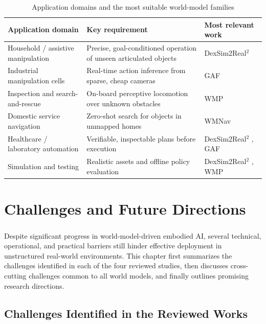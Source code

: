 \documentclass[12pt,a4paper,final]{extreport}
\begin{document}
{\renewcommand{\arraystretch}{1.35}
\begin{table}[htbp]
\centering
\caption{Application domains and the most suitable world-model families}\label{tab:applications}
\small
\begin{tabularx}{\textwidth}{|p{3.6cm}|X|p{3.2cm}|}
\hline
\textbf{Application domain} & \textbf{Key requirement} & \textbf{Most relevant work} \\ \hline
Household / assistive manipulation & Precise, goal-conditioned operation of unseen articulated objects & DexSim2Real$^2$ \cite{p1} \\ \hline
Industrial manipulation cells & Real-time action inference from sparse, cheap cameras & GAF \cite{p2} \\ \hline
Inspection and search-and-rescue & On-board perceptive locomotion over unknown obstacles & WMP \cite{p3} \\ \hline
Domestic service navigation & Zero-shot search for objects in unmapped homes & WMNav \cite{p4} \\ \hline
Healthcare / laboratory automation & Verifiable, inspectable plans before execution & DexSim2Real$^2$ \cite{p1}, GAF \cite{p2} \\ \hline
Simulation and testing & Realistic assets and offline policy evaluation & DexSim2Real$^2$ \cite{p1}, WMP \cite{p3} \\ \hline
\end{tabularx}
\end{table}}

\chapter{Challenges and Future Directions}

\paragraph{}
Despite significant progress in world-model-driven embodied AI, several technical, operational, and practical barriers still hinder effective deployment in unstructured real-world environments. This chapter first summarizes the challenges identified in each of the four reviewed studies, then discusses cross-cutting challenges common to all world models, and finally outlines promising research directions.

\section{Challenges Identified in the Reviewed Works}
\end{document}
